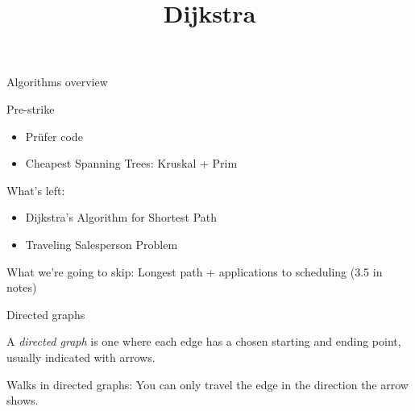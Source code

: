 \documentclass{beamer}
\title{Dijkstra}
\begin{document}
\begin{frame}{Algorithms overview}


  \begin{block}{Pre-strike}
    \begin{itemize}
    \item Pr\"ufer code
      \item Cheapest Spanning Trees: Kruskal + Prim
     \end{itemize}
  \end{block}

  
  \begin{block}{What's left:}
    \begin{itemize}
    \item Dijkstra's Algorithm for Shortest Path
    \item Traveling Salesperson Problem
    \end{itemize}
  \end{block}

  \begin{block}{What we're going to skip:}
    Longest path + applications to scheduling (3.5 in notes)
  \end{block}



    

\end{frame}

\begin{frame}{Directed graphs}
  \begin{definition} A \emph{directed graph} is one where each edge has a chosen starting and ending point, usually indicated with arrows.
 \end{definition}
\begin{center}
\end{center}


  
  \begin{block}{Walks in directed graphs:}
You can only travel the edge in the direction the arrow shows.
    \end{block}
\end{frame}
\end{document}
